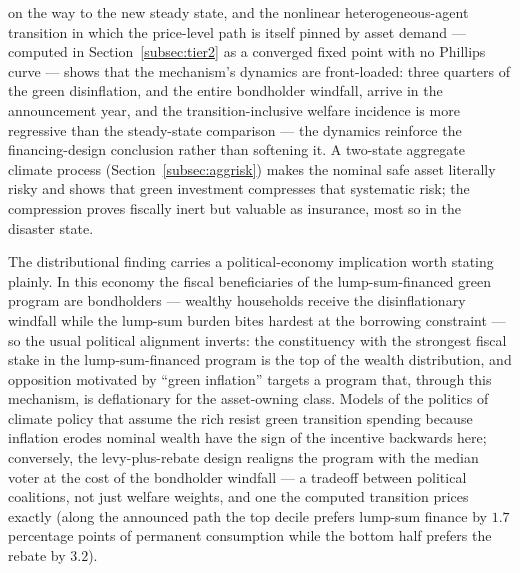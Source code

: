 \documentclass[12pt]{article}
\begin{document}
on the way to the new steady state, and the nonlinear heterogeneous-agent
transition in which the price-level path is itself pinned by asset demand
--- computed in Section~\ref{subsec:tier2} as a converged fixed point with
no Phillips curve --- shows that the mechanism's dynamics are front-loaded:
three quarters of the green disinflation, and the entire bondholder
windfall, arrive in the announcement year, and the transition-inclusive
welfare incidence is more regressive than the steady-state comparison ---
the dynamics reinforce the financing-design conclusion rather than
softening it. A two-state aggregate climate
process (Section~\ref{subsec:aggrisk}) makes the nominal safe asset
literally risky and shows that green investment compresses that
systematic risk; the compression proves fiscally inert but valuable as
insurance, most so in the disaster state.

The distributional finding carries a political-economy implication worth
stating plainly. In this economy the fiscal beneficiaries of the
lump-sum-financed green program are bondholders --- wealthy households
receive the disinflationary windfall while the lump-sum burden bites
hardest at the borrowing constraint --- so the usual political alignment
inverts: the constituency with the strongest fiscal stake in the
lump-sum-financed program is the top of the wealth distribution, and
opposition motivated
by ``green inflation'' targets a program that, through this mechanism, is
deflationary for the asset-owning class. Models of the politics of climate
policy that assume the rich resist green transition spending
because inflation erodes nominal wealth have the sign of the incentive
backwards here; conversely, the levy-plus-rebate design realigns the
program with the median voter at the cost of the bondholder windfall ---
a tradeoff between political coalitions, not just welfare weights, and one
the computed transition prices exactly (along the announced path the top
decile prefers lump-sum finance by $1.7$ percentage points of permanent
consumption while the bottom half prefers the rebate by $3.2$).
\end{document}
